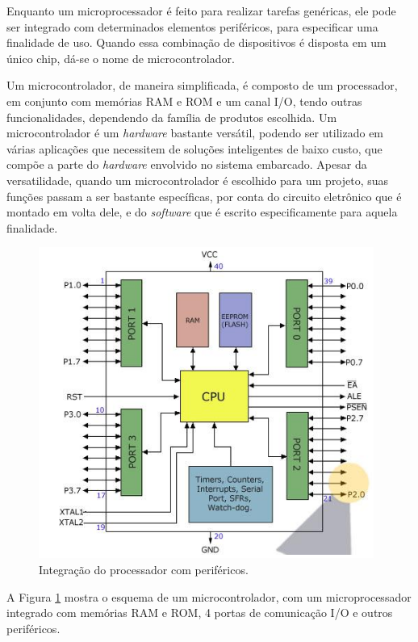 Enquanto um microprocessador é feito para realizar tarefas genéricas, ele pode ser integrado com determinados elementos periféricos, para especificar uma finalidade de uso. Quando essa combinação de dispositivos é disposta em um único chip, dá-se o nome de microcontrolador.

Um microcontrolador, de maneira simplificada, é composto de um processador, em conjunto com memórias \ac{RAM} e \ac{ROM} e um canal \ac{I/O}, tendo outras funcionalidades, dependendo da família de produtos escolhida. Um microcontrolador é um \textit{hardware} bastante versátil, podendo ser utilizado em várias aplicações que necessitem de soluções inteligentes de baixo custo, que compõe a parte do \textit{hardware} envolvido no sistema embarcado. Apesar da versatilidade, quando um microcontrolador é escolhido para um projeto, suas funções passam a ser bastante específicas, por conta do circuito eletrônico que é montado em volta dele, e do \textit{software} que é escrito especificamente para aquela finalidade.

\begin{figure}[ht]
    \begin{center}
    \includegraphics{figuras/microprocessador.PNG}
    \end{center}
    \caption[Microcontrolador]{Integração do processador com periféricos.}
    \label{microcontrolador}
\end{figure}

A Figura \ref{microcontrolador} mostra o esquema de um microcontrolador, com um microprocessador integrado com memórias \ac{RAM} e \ac{ROM}, 4 portas de comunicação \ac{I/O} e outros periféricos.


